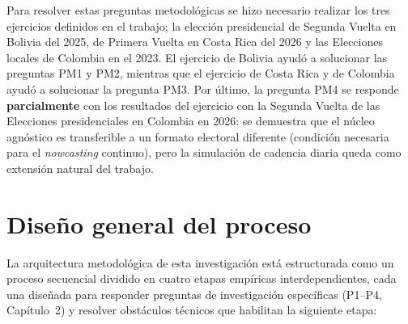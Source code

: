 Para resolver estas preguntas metodológicas se hizo necesario realizar los tres ejercicios definidos en el trabajo; la elección presidencial de Segunda Vuelta en Bolivia del 2025, de Primera Vuelta en Costa Rica del 2026 y las Elecciones locales de Colombia en el 2023. El ejercicio de Bolivia ayudó a solucionar las preguntas PM1 y PM2, mientras que el ejercicio de Costa Rica y de Colombia ayudó a solucionar la pregunta PM3. Por último, la pregunta PM4 se responde \textbf{parcialmente} con los resultados del ejercicio con la Segunda Vuelta de las Elecciones presidenciales en Colombia en 2026: se demuestra que el núcleo agnóstico es transferible a un formato electoral diferente (condición necesaria para el \textit{nowcasting} continuo), pero la simulación de cadencia diaria queda como extensión natural del trabajo.

\section{Diseño general del proceso}

La arquitectura metodológica de esta investigación está estructurada como un proceso secuencial dividido en cuatro etapas empíricas interdependientes, cada una diseñada para responder preguntas de investigación específicas (P1--P4, Capítulo~2) y resolver obstáculos técnicos que habilitan la siguiente etapa:

